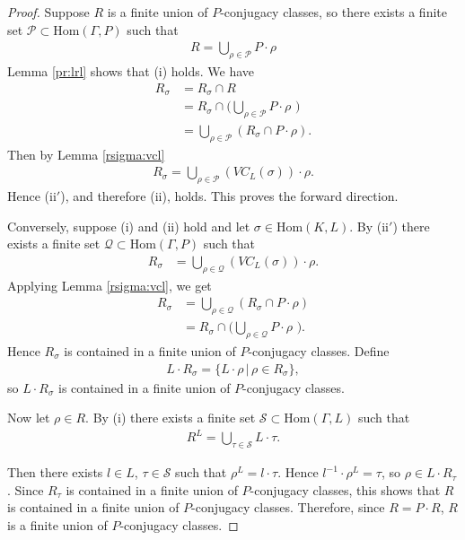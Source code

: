 \begin{proof}
Suppose $R$ is a finite union of $P$-conjugacy classes, so there exists a finite set $\mathcal{P} \subset \mathrm{Hom}(\Gamma, P)$ such that
\begin{align*} R = \bigcup_{\rho \in \mathcal{P}} P \cdot \rho \end{align*}
Lemma \ref{pr:lrl} shows that (i) holds. We have
\begin{align*} R_\sigma &= R_\sigma \cap R \\
&= R_\sigma \cap \big( \bigcup_{\rho \in \mathcal{P}} P \cdot \rho \,\,\big) \\
&= \bigcup_{\rho \in \mathcal{P}} \left( R_\sigma \cap P \cdot \rho \right).
\end{align*}
Then by Lemma \ref{rsigma:vcl}
\begin{align*} R_\sigma = \bigcup_{\rho \in \mathcal{P}} (VC_L(\sigma)) \cdot \rho. \end{align*}
Hence (ii$'$), and therefore (ii), holds. This proves the forward direction.


Conversely, suppose (i) and (ii) hold and let $\sigma \in \mathrm{Hom}(K, L)$. By (ii$'$) there exists a finite set $\mathcal{Q} \subset \mathrm{Hom}(\Gamma, P)$ such that
\begin{align*}
	R_\sigma &= \bigcup_{\rho \in \mathcal{Q}} (VC_L(\sigma)) \cdot \rho.
\end{align*}
Applying Lemma \ref{rsigma:vcl}, we get
\begin{align*}
	R_\sigma &= \bigcup_{\rho \in \mathcal{Q}} \left( R_\sigma \cap P \cdot \rho \right) \\
	&= R_\sigma \cap \big( \bigcup_{\rho \in \mathcal{Q}} P \cdot \rho \,\,\big).
\end{align*}
Hence $R_\sigma$ is contained in a finite union of $P$-conjugacy classes.
Define
\begin{align*}
L \cdot R_\sigma = \{L \cdot \rho \,|\, \rho \in R_\sigma\},
\end{align*}
so $L \cdot R_\sigma$ is contained in a finite union of $P$-conjugacy classes.

Now let $\rho \in R$. By (i) there exists a finite set $\mathcal{S} \subset \mathrm{Hom}(\Gamma, L)$ such that
\begin{align*}
R^L = \bigcup_{\tau \in \mathcal{S}} L \cdot \tau.
\end{align*}

Then there exists $l \in L$, $\tau \in \mathcal{S}$ such that $\rho^L = l \cdot \tau$. Hence $l^{-1} \cdot \rho^L = \tau$, so $\rho \in L \cdot R_\tau$. Since $R_\tau$ is contained in a finite union of $P$-conjugacy classes, this shows that $R$ is contained in a finite union of $P$-conjugacy classes. Therefore, since $R=P\cdot R$, $R$ is a finite union of $P$-conjugacy classes.
\end{proof}

